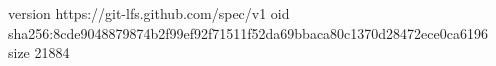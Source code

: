 version https://git-lfs.github.com/spec/v1
oid sha256:8cde9048879874b2f99ef92f71511f52da69bbaca80c1370d28472ece0ca6196
size 21884
